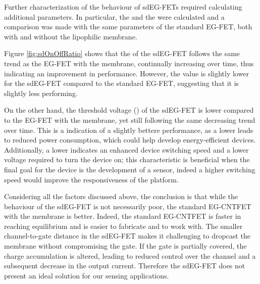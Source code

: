 Further characterization of the behaviour of sdEG-FETs required calculating additional parameters. In particular, the \ratio{} and the \vth{} were calculated and a comparison was made with the same parameters of the standard EG-FET, both with and without the lipophilic membrane.

Figure \ref{fig:sdOnOffRatio} shows that the \ratio{} of the sdEG-FET follows the same trend as the EG-FET with the membrane, continually increasing over time, thus indicating an improvement in performance. However, the value is slightly lower for the sdEG-FET compared to the standard EG-FET, suggesting that it is slightly less performing.

On the other hand, the threshold voltage (\vth{}) of the sdEG-FET is lower
compared to the EG-FET with the membrane, yet still following the same
decreasing trend over time. This is a indication of a slightly bettere
performance, as a lower \vth{} leads to reduced power consumption, which could
help develop energy-efficient devices. Additionally, a lower \vth{} indicates an
enhanced device switching speed and a lower voltage required to turn the device
on; this characteristic is beneficial when the final goal for the device is the
development of a sensor, indeed a higher switching speed would improve the
responsiveness of the platform.

Considering all the factors discussed above, the conclusion is that while the behaviour of the sdEG-FET is not necessarily poor, the standard EG-CNTFET with the membrane is better. Indeed, the standard EG-CNTFET is faster in reaching equilibrium and is easier to fabricate and to work with. The smaller channel-to-gate distance in the sdEG-FET makes it challenging to dropcast the membrane without compromising the gate. If the gate is partially covered, the charge accumulation is altered, leading to reduced control over the channel and a subsequent decrease in the output current. Therefore the sdEG-FET does not present an ideal solution for our sensing applications.
